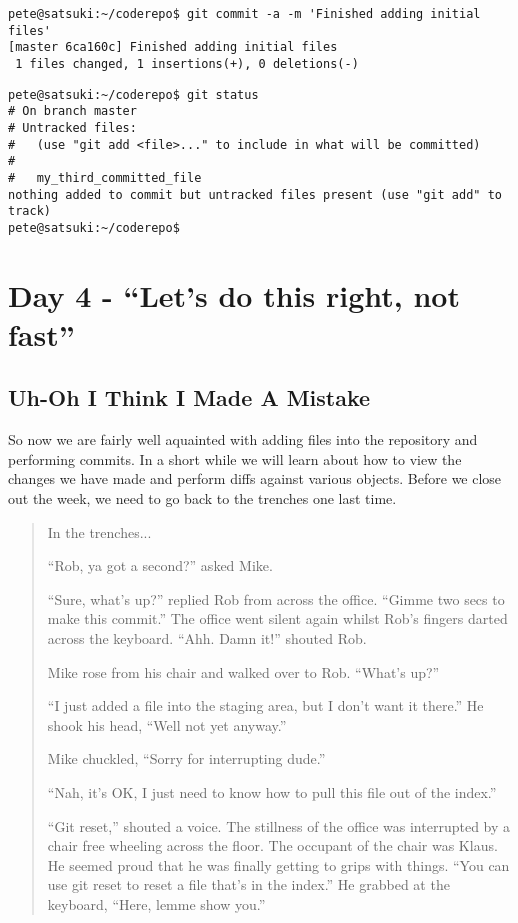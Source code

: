 \begin{verbatim} 
pete@satsuki:~/coderepo$ git commit -a -m 'Finished adding initial files' 
[master 6ca160c] Finished adding initial files 
 1 files changed, 1 insertions(+), 0 deletions(-) 
\end{verbatim} 

\begin{verbatim} 
pete@satsuki:~/coderepo$ git status 
# On branch master 
# Untracked files: 
#   (use "git add <file>..." to include in what will be committed) 
# 
#	my_third_committed_file 
nothing added to commit but untracked files present (use "git add" to track) 
pete@satsuki:~/coderepo$ 
\end{verbatim} 

\section*{Day 4 - ``Let's do this right, not fast''}

\subsection*{Uh-Oh I Think I Made A Mistake}

So now we are fairly well aquainted with adding files into the repository and performing commits.  In a short while we will learn about how to view the changes we have made and perform diffs against various objects.  Before we close out the week, we need to go back to the trenches one last time.

\begin{quote}In the trenches...

``Rob, ya got a second?'' asked Mike.

``Sure, what's up?'' replied Rob from across the office.  ``Gimme two secs to make this commit.''  The office went silent again whilst Rob's fingers darted across the keyboard.  ``Ahh.  Damn it!'' shouted Rob.  

Mike rose from his chair and walked over to Rob.  ``What's up?''

``I just added a file into the staging area, but I don't want it there.''  He shook his head, ``Well not yet anyway.''

Mike chuckled, ``Sorry for interrupting dude.''

``Nah, it's OK, I just need to know how to pull this file out of the index.''

``Git reset,'' shouted a voice.  The stillness of the office was interrupted by a chair free wheeling across the floor.  The occupant of the chair was Klaus.  He seemed proud that he was finally getting to grips with things.  ``You can use git reset to reset a file that's in the index.''  He grabbed at the keyboard, ``Here, lemme show you.''
\end{quote}

